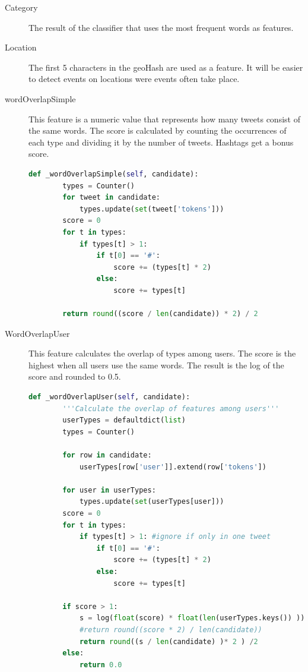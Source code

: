\documentclass[
10pt, %
a4paper, %
oneside, %
headinclude,footinclude, %
BCOR5mm, %
]{scrartcl}
\begin{document}
\begin{description}

\item[Category]
The result of the classifier that uses the most frequent words as features. 

\item[Location]
The first 5 characters in the geoHash are used as a feature. It will be easier to detect events on locations were events often take place.

\item[wordOverlapSimple]
This feature is a numeric value that represents how many tweets consist of the same words. The score is calculated by counting the occurrences of each type and dividing it by the number of tweets. Hashtags get a bonus score.
\newpage
\begin{lstlisting}[language=Python, caption=Word overlap feature]
def _wordOverlapSimple(self, candidate):
        types = Counter()
        for tweet in candidate:
            types.update(set(tweet['tokens']))
        score = 0
        for t in types:
            if types[t] > 1:
                if t[0] == '#':
                    score += (types[t] * 2)
                else:
                    score += types[t]

        return round((score / len(candidate)) * 2) / 2
\end{lstlisting}

\item[WordOverlapUser]
This feature calculates the overlap of types among users. The score is the highest when all users use the same words. The result is the log of the score and rounded to 0.5.

\begin{lstlisting}[language=Python, caption=User word overlap feature]
def _wordOverlapUser(self, candidate):
        '''Calculate the overlap of features among users'''
        userTypes = defaultdict(list)
        types = Counter()

        for row in candidate:
            userTypes[row['user']].extend(row['tokens'])
        
        for user in userTypes:
            types.update(set(userTypes[user]))
        score = 0
        for t in types:
            if types[t] > 1: #ignore if only in one tweet
                if t[0] == '#':
                    score += (types[t] * 2)
                else:
                    score += types[t]

        if score > 1:
            s = log(float(score) * float(len(userTypes.keys()) )) 
            #return round((score * 2) / len(candidate))
            return round((s / len(candidate) )* 2 ) /2 
        else:
            return 0.0
\end{lstlisting}

\end{description}
\newpage
\end{document}
